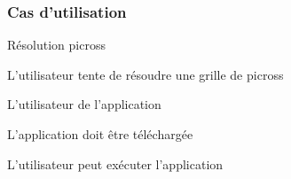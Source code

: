 \documentclass[a4paper, 12pt, twoside]{article}
\begin{document}
\subsubsection*{Cas d'utilisation }

\begin{description}\setlength{\itemsep}{0mm}

 \item[Nom :] Résolution picross  
 \item[Description :] L’utilisateur tente de résoudre une grille de picross 
 \item[Acteur :] L'utilisateur de l'application 
 \item[Préalables :]  L'application doit être téléchargée
 \item[Conséquents :] L'utilisateur peut exécuter l'application\newline
 
\end{description}
\end{document}
